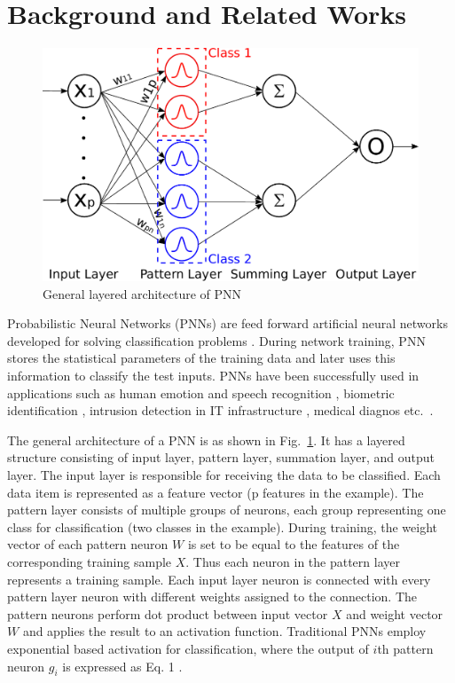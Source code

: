 \section{Background and Related Works}
\label{sec_related}

\begin{figure}[t]
\centering
   \includegraphics[height=0.6\columnwidth]{Figures/pnn.pdf}
   \caption{General layered architecture of PNN}
   \label{fig:pnn}
\end{figure}

Probabilistic Neural Networks (PNNs) are feed forward artificial neural networks developed for solving classification problems \cite{specht1990}.
During network training, PNN stores the statistical parameters of the training data and later uses this information to classify the test inputs.
PNNs have been successfully used in applications such as human emotion \cite{zhang2016pnn} and speech recognition \cite{wrobel2017}, biometric identification \cite{junjea2015}, intrusion detection in IT infrastructure \cite{raman2017,zhao2017}, medical diagnos etc.~\cite{mangayarkarasi2017,thara2016}.


The general architecture of a PNN is as shown in Fig.~\ref{fig:pnn}.
It has a layered structure consisting of input layer, pattern layer, summation layer, and output layer. 
The input layer is responsible for receiving the data to be classified. 
Each data item is represented as a feature vector (p features in the example).
The pattern layer consists of multiple groups of neurons, each group representing one class for classification (two classes in the example).
During training, the weight vector of each pattern neuron $W$ is set to be equal to the features of the corresponding training sample $X$.
Thus each neuron in the pattern layer represents a training sample.
Each input layer neuron is connected with every pattern layer neuron with different weights assigned to the connection. 
The pattern neurons perform dot product between input vector $X$ and weight vector $W$ and applies the result to an activation function. 
Traditional PNNs employ exponential based activation for classification, where the output of $i$th pattern neuron $g_i$ is expressed as Eq. 1 \cite{specht1988}.

